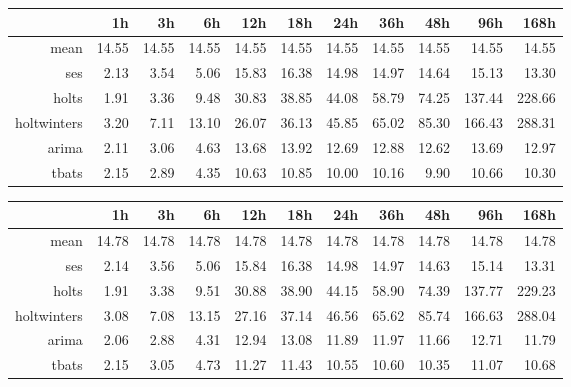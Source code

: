 \begin{table}[ht]
\centering
\begin{tabular}{rrrrrrrrrrr}
  \hline
 & 1h & 3h & 6h & 12h & 18h & 24h & 36h & 48h & 96h & 168h \\ 
  \hline
mean & 14.55 & 14.55 & 14.55 & 14.55 & 14.55 & 14.55 & 14.55 & 14.55 & 14.55 & 14.55 \\ 
  ses & 2.13 & 3.54 & 5.06 & 15.83 & 16.38 & 14.98 & 14.97 & 14.64 & 15.13 & 13.30 \\ 
  holts & 1.91 & 3.36 & 9.48 & 30.83 & 38.85 & 44.08 & 58.79 & 74.25 & 137.44 & 228.66 \\ 
  holtwinters & 3.20 & 7.11 & 13.10 & 26.07 & 36.13 & 45.85 & 65.02 & 85.30 & 166.43 & 288.31 \\ 
  arima & 2.11 & 3.06 & 4.63 & 13.68 & 13.92 & 12.69 & 12.88 & 12.62 & 13.69 & 12.97 \\ 
  tbats & 2.15 & 2.89 & 4.35 & 10.63 & 10.85 & 10.00 & 10.16 & 9.90 & 10.66 & 10.30 \\ 
   \hline
\end{tabular}
\end{table}
\begin{table}[ht]
\centering
\begin{tabular}{rrrrrrrrrrr}
  \hline
 & 1h & 3h & 6h & 12h & 18h & 24h & 36h & 48h & 96h & 168h \\ 
  \hline
mean & 14.78 & 14.78 & 14.78 & 14.78 & 14.78 & 14.78 & 14.78 & 14.78 & 14.78 & 14.78 \\ 
  ses & 2.14 & 3.56 & 5.06 & 15.84 & 16.38 & 14.98 & 14.97 & 14.63 & 15.14 & 13.31 \\ 
  holts & 1.91 & 3.38 & 9.51 & 30.88 & 38.90 & 44.15 & 58.90 & 74.39 & 137.77 & 229.23 \\ 
  holtwinters & 3.08 & 7.08 & 13.15 & 27.16 & 37.14 & 46.56 & 65.62 & 85.74 & 166.63 & 288.04 \\ 
  arima & 2.06 & 2.88 & 4.31 & 12.94 & 13.08 & 11.89 & 11.97 & 11.66 & 12.71 & 11.79 \\ 
  tbats & 2.15 & 3.05 & 4.73 & 11.27 & 11.43 & 10.55 & 10.60 & 10.35 & 11.07 & 10.68 \\ 
   \hline
\end{tabular}
\end{table}
